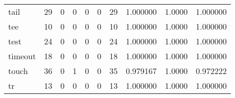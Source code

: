 \begin{longtable}{lrrrrrrrrr}
tail      &                                       29 &                                                  0 &                                                  0 &                                                  0 &                                                  0 &                                                 29 &                                           1.000000 &                                 1.0000 &                             1.000000 \\
tee       &                                       10 &                                                  0 &                                                  0 &                                                  0 &                                                  0 &                                                 10 &                                           1.000000 &                                 1.0000 &                             1.000000 \\
test      &                                       24 &                                                  0 &                                                  0 &                                                  0 &                                                  0 &                                                 24 &                                           1.000000 &                                 1.0000 &                             1.000000 \\
timeout   &                                       18 &                                                  0 &                                                  0 &                                                  0 &                                                  0 &                                                 18 &                                           1.000000 &                                 1.0000 &                             1.000000 \\
touch     &                                       36 &                                                  0 &                                                  1 &                                                  0 &                                                  0 &                                                 35 &                                           0.979167 &                                 1.0000 &                             0.972222 \\
tr        &                                       13 &                                                  0 &                                                  0 &                                                  0 &                                                  0 &                                                 13 &                                           1.000000 &                                 1.0000 &                             1.000000 \\

\end{longtable}
